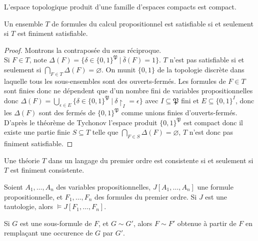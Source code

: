 \documentclass[a4paper]{article}
\begin{document}
\begin{theorem}[Tychonov]
  L'espace topologique produit d'une famille d'espaces compacts est compact.
\end{theorem}

\begin{theorem}
  Un ensemble $T$ de formules du calcul propositionnel est satisfiable si et seulement si $T$ est finiment satisfiable.
\end{theorem}

\begin{proof}
  Montrons la contraposée du sens réciproque.\\
  Si $F \in T$, note $\Delta(F) = \{\delta \in \{0,1\}^{\mathfrak{P}}\ |\ \overline{\delta} (F) = 1\}$. $T$ n'est pas satisfiable si et seulement si $\bigcap_{F \in T}\Delta(F) = \varnothing$. On munit $\{0,1\}$ de la topologie discrète dans laquelle tous les sous-ensembles sont des ouverts-fermés. Les formules de $F \in T$ sont finies donc ne dépendent que d'un nombre fini de variables propositionnelles donc $\Delta(F) = \bigcup_{\epsilon \in E}\{\delta \in \{0,1\}^{\mathfrak{P}}\ |\ \delta\restriction_I = \epsilon \}$ avec $I \subseteq \mathfrak{P}$ fini et $E \subseteq \{0,1\}^I$, donc les $\Delta(F)$ sont des fermés de $\{0,1\}^{\mathfrak{P}}$ comme unions finies d'ouverts-fermés. D'après le théorème de Tychonov l'espace produit $\{0,1\}^{\mathfrak{P}}$ est compact donc il existe une partie finie $S \subseteq T$ telle que $\bigcap_{F \in S}\Delta(F) = \varnothing$, $T$ n'est donc pas finiment satisfiable.
\end{proof}

\begin{theorem}
  Une théorie $T$ dans un langage du premier ordre est consistente si et seulement si $T$ est finiment consistente.
\end{theorem}

\begin{lemma}
  Soient $A_1,\dots,A_n$ des variables propositionnelles, $J[A_1,\dots,A_n]$ une formule propositionnelle, et $F_1,\dots,F_n$ des formules du premier ordre.
  Si $J$ est une tautologie, alors $\models J[F_1,\dots,F_n]$.
\end{lemma}

\begin{lemma}
  Si $G$ est une sous-formule de $F$, et $G \sim G'$, alors $F \sim F'$ obtenue à partir de $F$ en remplaçant une occurence de $G$ par $G'$.
\end{lemma}
\end{document}
